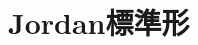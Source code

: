     \section{Jordan標準形}{
        \newcommand{\JBn}{%
            \begin{bmatrix}%
                \lambda & 1          & 0          & \cdots      & 0\\%
                0       & \lambda    & 1          &             & \vdots\\%
                \vdots  & \ddots     & \ddots     & \ddots      & 0\\%
                        &            & 0          & \lambda     & 1\\%
                0       & \cdots     &            & 0           & \lambda%
            \end{bmatrix}%
        }
}
